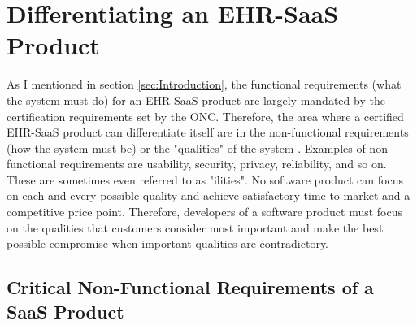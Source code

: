 \documentclass[10pt]{article}
\begin{document}
\section{Differentiating an EHR-SaaS Product}
\label{sec:Critical-EhrSaaS-Ilities}

As I mentioned in section \ref{sec:Introduction}, the functional requirements (what the system must do) for an EHR-SaaS product are largely mandated by the certification requirements set by the ONC.
Therefore, the area where a certified EHR-SaaS product can differentiate itself are in the non-functional requirements (how the system must be) or the "qualities" of the system \cite{wiki-nfr}.
Examples of non-functional requirements are usability, security, privacy, reliability, and so on.
These are sometimes even referred to as "ilities".
No software product can focus on each and every possible quality and achieve satisfactory time to market and a competitive price point.
Therefore, developers of a software product must focus on the qualities that customers consider most important and make the best possible compromise when important qualities are contradictory.


\subsection{Critical Non-Functional Requirements of a SaaS Product}
\label{sec:Critical-SaaS-Ilities}
\end{document}
